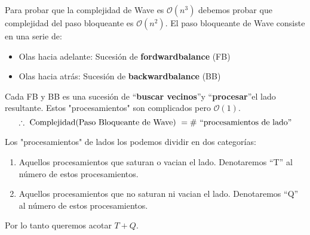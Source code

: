 \documentclass[12pt,a4paper]{report}
\begin{document}
			\par Para probar que la complejidad de Wave es $\mathcal{O}(n^{3})$ debemos probar que complejidad del paso bloqueante es $\mathcal{O}(n^{2})$. El paso bloqueante de Wave consiste en una serie de:
			\begin{itemize}
				\item Olas hacia adelante: Sucesión de \textbf{fordwardbalance} (FB)
				\item Olas hacia atrás: Sucesión de \textbf{backwardbalance} (BB)
			\end{itemize}

			\par Cada FB y BB es una sucesión de \textquotedblleft \textbf{buscar vecinos}\textquotedblright y \textquotedblleft \textbf{procesar}\textquotedblright el lado resultante. Estos "procesamientos" \; son complicados pero $ \mathcal{O}(1)$.
			\[ \therefore \textup{ Complejidad(Paso Bloqueante de Wave) } = \# \textup{ \textquotedblleft procesamientos de lado\textquotedblright} \]

			\par Los "procesamientos" de lados los podemos dividir en dos categorías:
			\begin{enumerate}
				\item Aquellos procesamientos que saturan o vacian el lado. Denotaremos \textquotedblleft T\textquotedblright \; al número de estos procesamientos.
				\item Aquellos procesamientos que no saturan ni vacian el lado. Denotaremos \textquotedblleft Q\textquotedblright \; al número de estos procesamientos.
			\end{enumerate}
			\par Por lo tanto queremos acotar $T + Q$.
\end{document}
